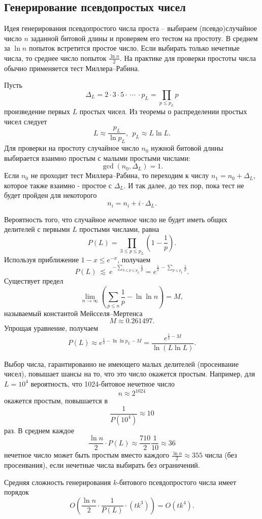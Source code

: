 \subsection{Генерирование псевдопростых чисел}

Идея генерирования псевдопростого числа проста -- выбираем (псевдо)случайное число $n$ заданной битовой длины и проверяем его тестом на простоту. В среднем за $\ln n$ попыток встретится простое число. Если выбирать только нечетные числа, то среднее число попыток $\frac{\ln n}{2}$. На практике для проверки простоты числа обычно применяется тест Миллера--Рабина.

Пусть
    \[ \Delta_L = 2 \cdot 3 \cdot 5 \cdot ~\cdots~ \cdot p_L = \prod \limits_{p \leq p_L} p \]
произведение первых $L$ простых чисел. Из теоремы о распределении простых чисел следует
    \[ L \approx \frac{p_L}{\ln p_L}, ~~ p_L \approx L \ln L. \]
Для проверки на простоту случайное число $n_0$ нужной битовой длины выбирается взаимно простым с малыми простыми числами:
    \[ \gcd(n_0, \Delta_L) = 1. \]
Если $n_0$ не проходит тест Миллера--Рабина, то переходим к числу $n_1 = n_0 + \Delta_L$, которое также взаимно - простое с $\Delta_L$. И так далее, до тех пор, пока тест не будет пройден  для некоторого
    \[ n_i = n_i + i \cdot \Delta_L. \]

Вероятность того, что случайное \textit{нечетное} число не будет иметь общих делителей с первыми $L$ простыми числами, равна
    \[ P(L) = \prod \limits_{3 \leq p \leq p_L} \left( 1 - \frac{1}{p} \right). \]
Используя приближение $1-x \leq e^{-x}$, получаем
    \[ P(L) ~\lesssim~ e^{-\sum\limits_{3 \leq p \leq p_L} \frac{1}{p}} = e^{\frac{1}{2} ~ - \sum\limits_{p \leq p_L} \frac{1}{p}}. \]
Существует предел
    \[ \lim \limits_{n \rightarrow \infty} \left( \sum \limits_{p \leq n} \frac{1}{p} - \ln \ln n \right) = M, \]
называемый константой Мейсселя--Мертенса
    \[ M \approx 0.261497. \]
Упрощая уравнение, получаем
    \[ P(L) \approx e^{\frac{1}{2} - \ln \ln p_L - M} = \frac{e^{\frac{1}{2} - M}}{\ln(L \ln L)}. \]

Выбор числа, гарантированно не имеющего малых делителей (просеивание чисел), повышает шансы на то, что это число окажется простым. Например, для $L = 10^4$ вероятность, что 1024-битовое нечетное число
    \[ n \approx 2^{1024} \]
окажется простым, повышается в
    \[ \frac{1}{P(10^4)} \approx 10 \]
раз. В среднем каждое
    \[ \frac{\ln n}{2} \cdot P(L) \approx \frac{710}{2} \frac{1}{10} \approx 36 \]
нечетное число может быть простым вместо каждого $\frac{\ln n}{2} \approx 355$ числа (без просеивания), если нечетные числа выбирать без ограничений.

Средняя сложность генерирования $k$-битового псевдопростого числа имеет порядок
    \[ O \left( \frac{\ln n}{2} \cdot \frac{1}{P(L)} \cdot \left( t k^3 \right) \right) = O(t k^4). \]
